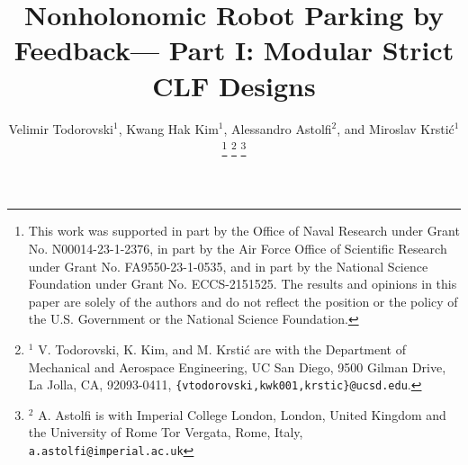 \documentclass[journal,twoside,web]{ieeecolor}
\theoremstyle{definition}
\begin{document}
\title{Nonholonomic Robot Parking by Feedback--- Part I: Modular Strict CLF Designs}

\author{Velimir Todorovski$^{1}$, 
        Kwang Hak Kim$^{1}$, Alessandro Astolfi$^{2}$, 
        and Miroslav Krsti\'{c}$^{1}$
\thanks{This work was supported in part by the Office of Naval Research under Grant No. N00014-23-1-2376, in part by the Air Force Office of Scientific Research under Grant No. FA9550-23-1-0535, and in
part by the National Science Foundation under Grant No. ECCS-2151525. The results and opinions in this paper are solely of the authors and do not reflect the position or the policy of the U.S. Government or the National Science
Foundation.}%
\thanks{$^{1}$ V. Todorovski, K. Kim, and M. Krsti\'{c} are with the Department of Mechanical and Aerospace Engineering, UC San Diego, 9500 Gilman Drive, La Jolla, CA, 92093-0411, {\tt\small \{vtodorovski,kwk001,krstic\}@ucsd.edu}.}%
\thanks{$^{2}$ A. Astolfi is with  Imperial College London, London,
United Kingdom and the University of Rome Tor Vergata, Rome, Italy,
{\tt\small a.astolfi@imperial.ac.uk}}%
}


\maketitle
\end{document}
